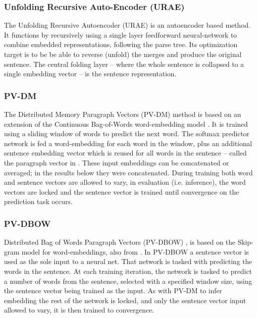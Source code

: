 \documentclass[]{book}
\begin{document}
\subsubsection{Unfolding Recursive Auto-Encoder (URAE)}

The Unfolding Recursive Autoencoder (URAE) \cite{SocherEtAl2011:PoolRAE}
is an autoencoder based method. It functions by recursively using
a single layer feedforward neural-network to combine embedded representations,
following the parse tree. Its optimization target is to be be able
to reverse (unfold) the merges and produce the original sentence.
The central folding layer -- where the whole sentence is collapsed
to a single embedding vector -- is the sentence representation.


\subsubsection{PV-DM}

The Distributed Memory Paragraph Vectors (PV-DM) \cite{le2014distributed}
method is based on an extension of the Continuous Bag-of-Words word-embedding
model \cite{mikolov2013efficient}. It is trained using a sliding
window of words to predict the next word. The softmax predictor network
is fed a word-embedding for each word in the window, plus an additional
sentence embedding vector which is reused for all words in the sentence
-- called the paragraph vector in \cite{le2014distributed}. These
input embeddings can be concatenated or averaged; in the results below
they were concatenated. During training both word and sentence vectors
are allowed to vary, in evaluation (i.e. inference), the word vectors
are locked and the sentence vector is trained until convergence on
the prediction task occurs. 


\subsubsection{PV-DBOW}

Distributed Bag of Words Paragraph Vectors (PV-DBOW) \cite{le2014distributed},
is based on the Skip-gram model for word-embeddings, also from \cite{mikolov2013efficient}.
In PV-DBOW a sentence vector is used as the sole input to a neural
net. That network is tasked with predicting the words in the sentence.
At each training iteration, the network is tasked to predict a number
of words from the sentence, selected with a specified window size,
using the sentence vector being trained as the input. As with PV-DM
to infer embedding the rest of the network is locked, and only the
sentence vector input allowed to vary, it is then trained to convergence.
\end{document}
